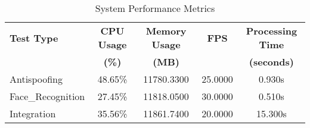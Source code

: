 \begin{table}[htbp]
\centering
\caption{System Performance Metrics}
\label{tab:performance_metrics}
\begin{tabular}{|l|c|c|c|c|}
\hline
\textbf{Test Type} & \textbf{CPU Usage} & \textbf{Memory Usage} & \textbf{FPS} & \textbf{Processing Time} \\
\textbf{} & \textbf{(\%)} & \textbf{(MB)} & \textbf{} & \textbf{(seconds)} \\
\hline
Antispoofing & 48.65\% & 11780.3300 & 25.0000 & 0.930s \\
\hline
Face_Recognition & 27.45\% & 11818.0500 & 30.0000 & 0.510s \\
\hline
Integration & 35.56\% & 11861.7400 & 20.0000 & 15.300s \\
\hline
\end{tabular}
\end{table}